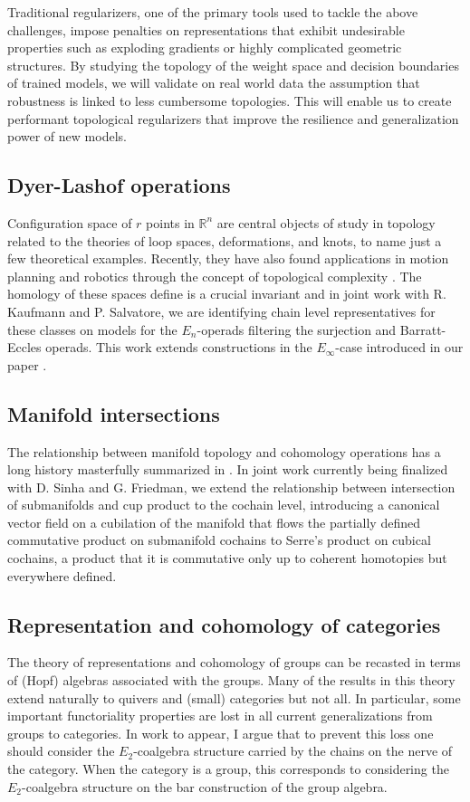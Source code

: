 Traditional regularizers, one of the primary tools used to tackle the above challenges, impose penalties on representations that exhibit undesirable properties such as exploding gradients or highly complicated geometric structures.
By studying the topology of the weight space and decision boundaries of trained models, we will validate on real world data the assumption that robustness is linked to less cumbersome topologies.
This will enable us to create performant topological regularizers that improve the resilience and generalization power of new models.

\subsection{Dyer-Lashof operations} Configuration space of $r$ points in $\mathbb R^n$ are central objects of study in topology related to the theories of loop spaces, deformations, and knots, to name just a few theoretical examples.
Recently, they have also found applications in motion planning and robotics through the concept of topological complexity \cite{farber2003topological, ghrist2010configuration}.
The homology of these spaces define is a crucial invariant and in joint work with R. Kaufmann and P. Salvatore, we are identifying chain level representatives for these classes on models for the $E_n$-operads filtering the surjection and Barratt-Eccles operads.
This work extends constructions in the $E_\infty$-case introduced in our paper \cite{medina2020maysteenrod}.

\subsection{Manifold intersections} The relationship between manifold topology and cohomology operations has a long history  masterfully summarized in \cite{milnor2016characteristic}.
In joint work currently being finalized with D. Sinha and G. Friedman, we extend the relationship between intersection of submanifolds and cup product to the cochain level, introducing a canonical vector field on a cubilation of the manifold that flows the partially defined commutative product on submanifold cochains to Serre's product on cubical cochains, a product that it is commutative only up to coherent homotopies but everywhere defined.

\subsection{Representation and cohomology of categories} The theory of representations and cohomology of groups can be recasted in terms of (Hopf) algebras associated with the groups.
Many of the results in this theory extend naturally to quivers and (small) categories but not all.
In particular, some important functoriality properties are lost in all current generalizations from groups to categories.
In work to appear, I argue that to prevent this loss one should consider the $E_2$-coalgebra structure carried by the chains on the nerve of the category.
When the category is a group, this corresponds to considering the $E_2$-coalgebra structure on the bar construction of the group algebra.

